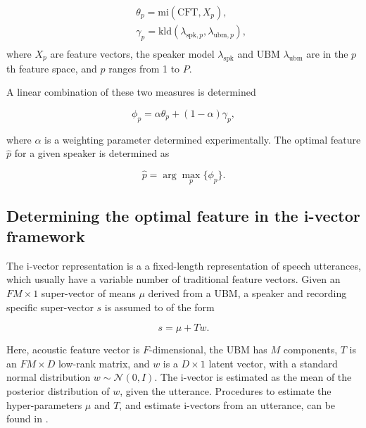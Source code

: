 \documentclass{article}
\begin{document}
\begin{eqnarray*}
&& \theta_p = \textrm{mi}(\textrm{CFT},X_{p}), \\
&& \gamma_p =
\textrm{kld}(\lambda_{\textrm{spk},p},\lambda_{\textrm{ubm},p}), \\
\end{eqnarray*} 
where $X_p$ are feature vectors, the speaker model $\lambda_{\textrm{spk}}$ and 
UBM $\lambda_{\textrm{ubm}}$ are in the $p$th feature space, and $p$ ranges from 1 to $P$.




A linear combination of these two measures is determined 

\begin{equation}
\phi_p = \alpha \theta_p  + (1-\alpha) \gamma_p,
\label{eq:phiFunc}
\end{equation}

where $\alpha$ is a weighting parameter determined experimentally. The optimal
feature $\hat{p}$ for a given speaker is determined as 

\begin{equation}
\hat{p} = \arg\max_p \{\phi_p\}.
\label{eq:ubm_optFeat}
\end{equation}

\subsection{Determining the optimal feature in the i-vector framework}
\label{subsec:ivec_optFeat}

The i-vector representation \cite{dehak_ivector} is a a fixed-length
representation of speech utterances, which usually have a variable number of
traditional feature vectors.  Given an $FM \times 1$ super-vector of means $\mu$
derived from a UBM, a speaker and recording specific super-vector $s$ is assumed to of
the form

\begin{equation}
s = \mu + T w.
\end{equation}

Here, acoustic feature vector is $F$-dimensional, the UBM has $M$ components,
$T$ is an $FM \times D$ low-rank matrix, and $w$ is a $D \times 1$ latent
vector, with a standard normal distribution $w \sim \mathcal{N}(0,I)$. The
i-vector is estimated as the mean of the posterior distribution of $w$, given
the utterance. Procedures to estimate the hyper-parameters $\mu$ and $T$, and 
estimate i-vectors from an utterance, can be found in \cite{dehak_ivector}.
\end{document}
